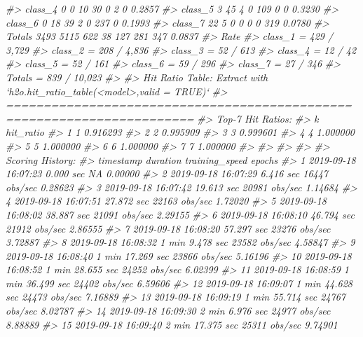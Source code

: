\documentclass[]{book}
\newenvironment{Shaded}{\begin{snugshade}}{\end{snugshade}}
\newcommand{\CommentTok}[1]{\textcolor[rgb]{0.56,0.35,0.01}{\textit{#1}}}
\begin{document}
\begin{Shaded}
\begin{Highlighting}[]
{{{{{{{{{{{{{{{{{{{{{{{{{{{{{{{{{{{{{{{{{\CommentTok{#> class_4       0       0      10      30       0       2       0 0.2857}
\CommentTok{#> class_5       3      45       4       0     109       0       0 0.3230}
\CommentTok{#> class_6       0      18      39       2       0     237       0 0.1993}
\CommentTok{#> class_7      22       5       0       0       0       0     319 0.0780}
\CommentTok{#> Totals     3493    5115     622      38     127     281     347 0.0837}
\CommentTok{#>                   Rate}
\CommentTok{#> class_1 =  429 / 3,729}
\CommentTok{#> class_2 =  208 / 4,836}
\CommentTok{#> class_3 =     52 / 613}
\CommentTok{#> class_4 =      12 / 42}
\CommentTok{#> class_5 =     52 / 161}
\CommentTok{#> class_6 =     59 / 296}
\CommentTok{#> class_7 =     27 / 346}
\CommentTok{#> Totals  = 839 / 10,023}
\CommentTok{#> }
\CommentTok{#> Hit Ratio Table: Extract with `h2o.hit_ratio_table(<model>,valid = TRUE)`}
\CommentTok{#> =======================================================================}
\CommentTok{#> Top-7 Hit Ratios: }
\CommentTok{#>   k hit_ratio}
\CommentTok{#> 1 1  0.916293}
\CommentTok{#> 2 2  0.995909}
\CommentTok{#> 3 3  0.999601}
\CommentTok{#> 4 4  1.000000}
\CommentTok{#> 5 5  1.000000}
\CommentTok{#> 6 6  1.000000}
\CommentTok{#> 7 7  1.000000}
\CommentTok{#> }
\CommentTok{#> }
\CommentTok{#> }
\CommentTok{#> }
\CommentTok{#> Scoring History: }
\CommentTok{#>              timestamp          duration training_speed   epochs}
\CommentTok{#> 1  2019-09-18 16:07:23         0.000 sec             NA  0.00000}
\CommentTok{#> 2  2019-09-18 16:07:29         6.416 sec  16447 obs/sec  0.28623}
\CommentTok{#> 3  2019-09-18 16:07:42        19.613 sec  20981 obs/sec  1.14684}
\CommentTok{#> 4  2019-09-18 16:07:51        27.872 sec  22163 obs/sec  1.72020}
\CommentTok{#> 5  2019-09-18 16:08:02        38.887 sec  21091 obs/sec  2.29155}
\CommentTok{#> 6  2019-09-18 16:08:10        46.794 sec  21912 obs/sec  2.86555}
\CommentTok{#> 7  2019-09-18 16:08:20        57.297 sec  23276 obs/sec  3.72887}
\CommentTok{#> 8  2019-09-18 16:08:32  1 min  9.478 sec  23582 obs/sec  4.58847}
\CommentTok{#> 9  2019-09-18 16:08:40  1 min 17.269 sec  23866 obs/sec  5.16196}
\CommentTok{#> 10 2019-09-18 16:08:52  1 min 28.655 sec  24252 obs/sec  6.02399}
\CommentTok{#> 11 2019-09-18 16:08:59  1 min 36.499 sec  24402 obs/sec  6.59606}
\CommentTok{#> 12 2019-09-18 16:09:07  1 min 44.628 sec  24473 obs/sec  7.16889}
\CommentTok{#> 13 2019-09-18 16:09:19  1 min 55.714 sec  24767 obs/sec  8.02787}
\CommentTok{#> 14 2019-09-18 16:09:30  2 min  6.976 sec  24977 obs/sec  8.88889}
\CommentTok{#> 15 2019-09-18 16:09:40  2 min 17.375 sec  25311 obs/sec  9.74901}
}}}}}}}}}}}}}}}}}}}}}}}}}}}}}}}}}}}}}}}}}
\end{Highlighting}
\end{Shaded}
\end{document}
